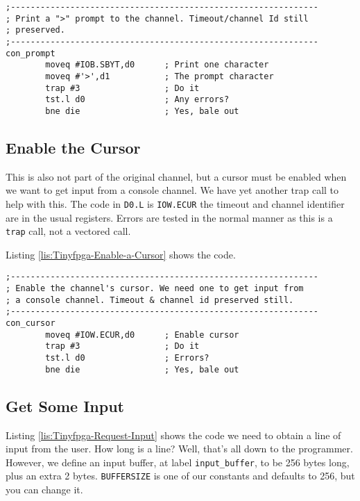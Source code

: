 \begin{lstlisting}[caption={Tinyfpga - Print a Prompt},label={lis:Tinyfpga-Print-a-Prompt}]
;--------------------------------------------------------------
; Print a ">" prompt to the channel. Timeout/channel Id still
; preserved.
;--------------------------------------------------------------
con_prompt
        moveq #IOB.SBYT,d0      ; Print one character
        moveq #'>',d1           ; The prompt character
        trap #3                 ; Do it
        tst.l d0                ; Any errors?
        bne die                 ; Yes, bale out

\end{lstlisting}


\subsection{Enable the Cursor}

This is also not part of the original channel, but a cursor must be
enabled when we want to get input from a console channel. We have
yet another trap call to help with this. The code in \texttt{D0.L}
is \texttt{IOW.ECUR} the timeout and channel identifier are in the
usual registers. Errors are tested in the normal manner as this is
a \texttt{trap} call, not a vectored call.

Listing \ref{lis:Tinyfpga-Enable-a-Cursor} shows the code.

\begin{lstlisting}[caption={Tinyfpga - Enable a Cursor},label={lis:Tinyfpga-Enable-a-Cursor}]
;--------------------------------------------------------------
; Enable the channel's cursor. We need one to get input from
; a console channel. Timeout & channel id preserved still.
;--------------------------------------------------------------
con_cursor
        moveq #IOW.ECUR,d0      ; Enable cursor
        trap #3                 ; Do it
        tst.l d0                ; Errors?
        bne die                 ; Yes, bale out

\end{lstlisting}


\subsection{Get Some Input}

Listing \ref{lis:Tinyfpga-Request-Input} shows the code we need to
obtain a line of input from the user. How long is a line? Well, that's
all down to the programmer. However, we define an input buffer, at
label \texttt{input\_buffer}, to be 256 bytes long, plus an extra
2 bytes. \texttt{BUFFERSIZE} is one of our constants and defaults
to 256, but you can change it.

